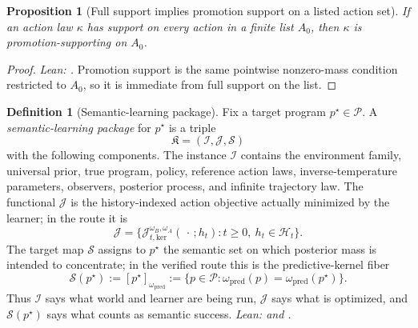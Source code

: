 \documentclass[11pt]{article}
\newtheorem{proposition}[theorem]{Proposition}
\theoremstyle{definition}
\newtheorem{definition}[theorem]{Definition}
\theoremstyle{remark}
\theoremstyle{plain}
\theoremstyle{definition}
\newcommand{\Pcal}{\mathcal{P}}
\newcommand{\Hcal}{\mathcal{H}}
\newcommand{\Scal}{\mathcal{S}}
\begin{document}
\begin{proposition}[Full support implies promotion support on a listed action set]
\label{prop:full-support-behavioral}
If an action law $\kappa$ has support on every action in a finite list $A_0$, then $\kappa$ is promotion-supporting on $A_0$.
\end{proposition}

\begin{proof}
\noindent\emph{Lean: .}
Promotion support is the same pointwise nonzero-mass condition restricted to $A_0$, so it is immediate from full support on the list.
\end{proof}

\begin{definition}[Semantic-learning package]
\label{def:semantic-learning-package}
Fix a target program $p^\star\in\Pcal$. A \emph{semantic-learning package} for $p^\star$ is a triple
\[
\mathfrak K=(\mathcal I,\mathcal J,\Scal)
\]
with the following components. The instance $\mathcal I$ contains the environment family, universal prior, true program, policy, reference action laws, inverse-temperature parameters, observers, posterior process, and infinite trajectory law. The functional $\mathcal J$ is the history-indexed action objective actually minimized by the learner; in the route it is
\[
\mathcal J
=\{\mathcal J_{t,\mathrm{ker}}^{\omega_B,\omega_A}(\,\cdot\,;h_t):t\ge0,\ h_t\in\Hcal_t\}.
\]
The target map $\Scal$ assigns to $p^\star$ the semantic set on which posterior mass is intended to concentrate; in the verified route this is the predictive-kernel fiber
\[
\Scal(p^\star)
:=
[p^\star]_{\omega_{\mathrm{pred}}}
:=
\{p\in\Pcal:\omega_{\mathrm{pred}}(p)=\omega_{\mathrm{pred}}(p^\star)\}.
\]
Thus $\mathcal I$ says what world and learner are being run, $\mathcal J$ says what is optimized, and $\Scal(p^\star)$ says what counts as semantic success.
\noindent\emph{Lean:  and .}
\end{definition}
\end{document}
